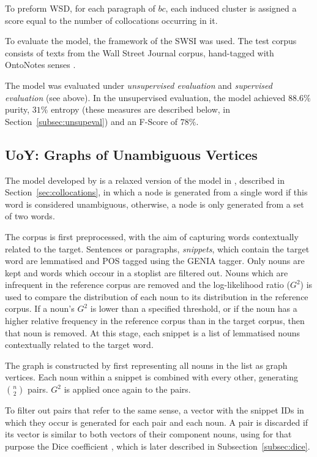 To preform \ac{WSD}, for each paragraph of $bc$, each induced cluster is
assigned a score equal to the number of collocations occurring in it.

To evaluate the model, the framework of the \ac{SWSI} \citep{agirre2007semeval}
was used. The test corpus consists of texts from the Wall Street Journal
corpus, hand-tagged with OntoNotes senses \citep{hovy2006ontonotes}.

The model was evaluated under \textit{unsupervised evaluation} and 
\textit{supervised evaluation} (see above). In the unsupervised evaluation, the 
model achieved $88.6\%$ purity, $31\%$ entropy (these measures are described 
below, in Section~\ref{subsec:unsupeval}) and an F-Score of $78\%$.

\subsection{UoY: Graphs of Unambiguous Vertices}

The model developed by \citet{korkontzelos2010uoy} is a relaxed version of the
model in \citep{klapaftis2008word}, described in Section~\ref{sec:collocations},
in which a node is generated from a single word if this word is considered 
unambiguous, otherwise, a node is only generated from a set of two words.

The corpus is first preprocessed, with the aim of capturing words contextually
related to the target. Sentences or paragraphs, \textit{snippets}, which contain
the target word are lemmatised and \ac{POS} tagged using the GENIA tagger. Only
nouns are kept and words which occour in a stoplist are filtered out. Nouns
which are infrequent in the reference corpus are removed and the log-likelihood
ratio ($G^2$) is used to compare the distribution of each noun to its
distribution in the reference corpus. If a noun's $G^2$ is lower than a
specified threshold, or if the noun has a higher relative frequency in the
reference corpus than in the target corpus, then that noun is removed. At this
stage, each snippet is a list of lemmatised nouns contextually related to the
target word.

The graph is constructed by first representing all nouns in the list as graph
vertices. Each noun within a snippet is combined with every other, generating
$\binom{n}{2}$ pairs. $G^2$ is applied once again to the pairs.

To filter out pairs that refer to the same sense, a vector with the snippet IDs
in which they occur is generated for each pair and each noun. A pair is
discarded if its vector is similar to both vectors of their component nouns,
using for that purpose the Dice coefficient \citep{dice1945measures}, which is 
later described in Subsection~\ref{subsec:dice}.

